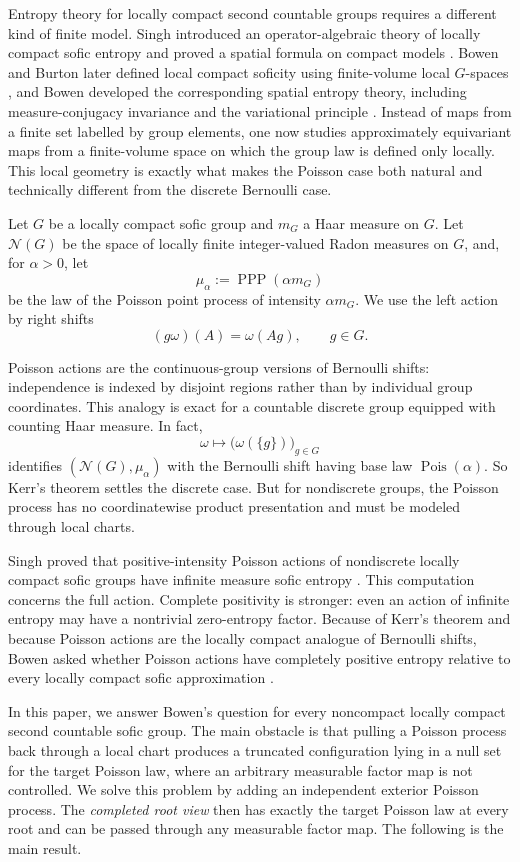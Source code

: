 \documentclass[12pt]{amsart}
\theoremstyle{definition}
\newcommand{\Haar}{m_G}
\newcommand{\PPP}{\operatorname{PPP}}
\newcommand{\cN}{\mathcal N}
\newcommand{\1}{\mathbf 1}
\begin{document}
Entropy theory for locally compact second countable groups requires a
different kind of finite model. Singh introduced an operator-algebraic theory
of locally compact sofic entropy and proved a spatial formula on compact
models \cite[Chapter~3]{SinghThesis}. Bowen and Burton later defined local
compact soficity using finite-volume local $G$-spaces
\cite{BowenBurton}, and Bowen developed the corresponding spatial entropy
theory, including measure-conjugacy invariance and the variational principle
\cite{BowenLCEntropy}. Instead of maps from a finite set labelled by group
elements, one now studies approximately equivariant maps from a finite-volume
space on which the group law is defined only locally. This local geometry is
exactly what makes the Poisson case both natural and technically different
from the discrete Bernoulli case.

Let $G$ be a locally compact sofic group and
$\Haar$ a Haar measure on $G$. Let $\cN(G)$ be the space of locally finite
integer-valued Radon measures on $G$, and, for $\alpha>0$, let
\[
 \mu_\alpha:=\PPP(\alpha\Haar)
\]
be the law of the Poisson point process of intensity $\alpha\Haar$. We use the
left action by right shifts
\[
 (g\omega)(A)=\omega(Ag),\qquad g\in G.
\]


Poisson actions are the continuous-group versions of Bernoulli shifts:
independence is indexed by disjoint regions rather than by individual group
coordinates. This analogy is exact for a countable discrete group equipped
with counting Haar measure. In fact,
\[
\omega\longmapsto \bigl(\omega(\{g\})\bigr)_{g\in G}
\]
identifies $(\cN(G),\mu_\alpha)$ with the Bernoulli shift having base law
$\operatorname{Pois}(\alpha)$. So Kerr's theorem settles the discrete case.
But for nondiscrete groups, the Poisson process has no
coordinatewise product presentation and must be modeled through local charts.

Singh proved that positive-intensity Poisson actions of nondiscrete locally
compact sofic groups have infinite measure sofic entropy
\cite[Chapter~5]{SinghThesis}. This computation concerns the full action.
Complete positivity is stronger: even an action of infinite
entropy may have a nontrivial zero-entropy factor. Because of Kerr's theorem
and because Poisson actions are the locally compact analogue of Bernoulli
shifts, Bowen asked whether Poisson actions have completely positive
entropy relative to every locally compact sofic approximation
\cite[Question~4]{BowenLCEntropy}.

In this paper, we answer Bowen's question for every noncompact locally
compact second countable sofic group. The main obstacle is that pulling a
Poisson process back through a local chart produces a truncated
configuration lying in a null set for the target Poisson law, where an
arbitrary measurable factor map is not controlled. We solve this problem by
adding an independent exterior Poisson process. The \emph{completed root view} then
has exactly the target Poisson law at every root
and can be passed through any measurable factor map. The following is the main result.
\end{document}
